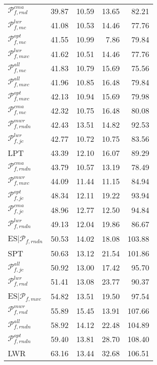 \begin{tabular}{|@{}l@{}|@{}r@{}|@{}r@{}|@{}r@{}|@{}r@{}|}
${\mathcal{P}_{f,rnd}^{cma}}$ &  39.87 &  10.59 &  13.65 &  82.21  \\ 
${\mathcal{P}_{f,mc}^{lwr}}$ &  41.08 &  10.53 &  14.46 &  77.76  \\ 
${\mathcal{P}_{f,mc}^{opt}}$ &  41.55 &  10.99 &  7.86 &  79.84  \\ 
${\mathcal{P}_{f,mxc}^{lwr}}$ &  41.62 &  10.51 &  14.46 &  77.76  \\ 
${\mathcal{P}_{f,mc}^{all}}$ &  41.83 &  10.79 &  15.69 &  75.56  \\ 
${\mathcal{P}_{f,mxc}^{all}}$ &  41.96 &  10.85 &  16.48 &  79.84  \\ 
${\mathcal{P}_{f,mxc}^{opt}}$ &  42.13 &  10.94 &  15.69 &  79.98  \\ 
${\mathcal{P}_{f,mc}^{cma}}$ &  42.32 &  10.75 &  16.48 &  80.08  \\ 
${\mathcal{P}_{f,rndn}^{mwr}}$ &  42.43 &  13.51 &  14.82 &  92.53  \\ \hline\hline
${\mathcal{P}_{f,jc}^{lwr}}$ &  42.77 &  10.72 &  10.75 &  83.56  \\ 
LPT &  43.39 &  12.10 &  16.07 &  89.29  \\ 
${\mathcal{P}_{f,rndn}^{cma}}$ &  43.79 &  10.57 &  13.19 &  78.49  \\ 
${\mathcal{P}_{f,mxc}^{mwr}}$ &  44.09 &  11.44 &  11.15 &  84.94  \\ \hline\hline
${\mathcal{P}_{f,jc}^{opt}}$ &  48.34 &  12.11 &  19.22 &  93.94  \\ 
${\mathcal{P}_{f,jc}^{cma}}$ &  48.96 &  12.77 &  12.50 &  94.84  \\ 
${\mathcal{P}_{f,rndn}^{lwr}}$ &  49.13 &  12.04 &  19.86 &  86.67  \\ 
ES${|\mathcal{P}_{f,rndn}}$ &  50.53 &  14.02 &  18.08 &  103.88  \\ 
SPT &  50.63 &  13.12 &  21.54 &  101.86  \\ 
${\mathcal{P}_{f,jc}^{all}}$ &  50.92 &  13.00 &  17.42 &  95.70  \\ 
${\mathcal{P}_{f,rnd}^{lwr}}$ &  51.41 &  13.08 &  23.77 &  90.37  \\ \hline\hline
ES${|\mathcal{P}_{f,mxc}}$ &  54.82 &  13.51 &  19.50 &  97.54  \\ \hline\hline
${\mathcal{P}_{f,rnd}^{mwr}}$ &  55.89 &  15.45 &  13.91 &  107.66  \\ \hline\hline
${\mathcal{P}_{f,rndn}^{all}}$ &  58.92 &  14.12 &  22.48 &  104.89  \\ 
${\mathcal{P}_{f,rndn}^{opt}}$ &  59.40 &  13.81 &  28.70 &  108.40  \\ \hline\hline
LWR &  63.16 &  13.44 &  32.68 &  106.51  \\ \hline
\end{tabular}
